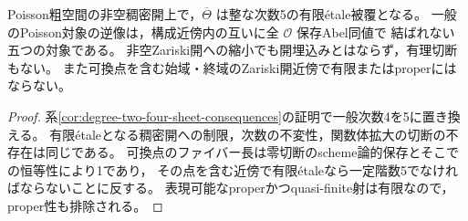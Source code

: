 \begin{corollary}[五つの一般逆像と零切断近傍]
\label{cor:degree-one-five-sheet-consequences}
Poisson粗空間の非空稠密開上で，$\overline\Theta$ は整な次数5の有限\'{e}tale被覆となる。
一般のPoisson対象の逆像は，構成近傍内の互いに全 $\mathcal O$ 保存Abel同値で
結ばれない五つの対象である。
非空Zariski開への縮小でも開埋込みとはならず，有理切断もない。
また可換点を含む始域・終域のZariski開近傍で有限またはproperにはならない。
\end{corollary}
\begin{proof}
系\ref{cor:degree-two-four-sheet-consequences}の証明で一般次数4を5に置き換える。
有限\'{e}taleとなる稠密開への制限，次数の不変性，関数体拡大の切断の不存在は同じである。
可換点のファイバー長は零切断のscheme論的保存とそこでの恒等性により1であり，
その点を含む近傍で有限\'{e}taleなら一定階数5でなければならないことに反する。
表現可能なproperかつquasi-finite射は有限なので，proper性も排除される。
\end{proof}
